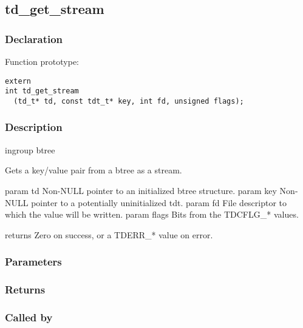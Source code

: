 
\newpage
\subsection{td\_get\_stream}
\subsubsection{Declaration} Function prototype:

\begin{verbatim}
extern
int td_get_stream
  (td_t* td, const tdt_t* key, int fd, unsigned flags);
\end{verbatim}

\subsubsection{Description}


 ingroup btree

 Gets a key/value pair from a btree as a stream.

 param td Non-NULL pointer to an initialized btree structure.
 param key Non-NULL pointer to a potentially uninitialized tdt.
 param fd File descriptor to which the value will be written.
 param flags Bits from the TDCFLG\_* values.

 returns Zero on success, or a TDERR\_* value on error.
 

\subsubsection{Parameters}
\subsubsection{Returns}
\subsubsection{Called by}
